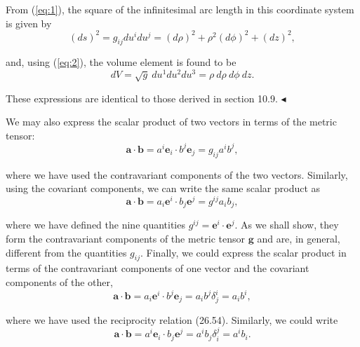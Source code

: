 \documentclass[9pt, twoside]{extbook}
\begin{document}
From (\ref{eq:1}), the square of the infinitesimal arc length in this coordinate system is given by
\begin{equation*}
	(ds)^{2} = g_{ij}du^{i}du^{j} = (d\rho)^{2} + \rho^{2}(d\phi)^{2} +(dz)^{2},
\end{equation*}

\noindent and, using (\ref{eq:2}), the volume element is found to be
\begin{equation*}
	dV = \sqrt{g} \ du^{1}du^{2}du^{3} = \rho \ d\rho \ d\phi \ dz.
\end{equation*}

\noindent These expressions are identical to those derived in section 10.9. $\blacktriangleleft$

\vspace{2mm}

\normalsize We may also express the scalar product of two vectors in terms of the metric tensor:
\begin{equation}
	\label{eq:4}
	\boldsymbol{a} \cdot \boldsymbol{b} = a^{i}\boldsymbol{e}_{i} \cdot b^{j}\boldsymbol{e}_{j} = g_{ij}a^{i}b^{j},
\end{equation}

\noindent where we have used the contravariant components of the two vectors. Similarly, using the covariant components, we can write the same scalar product as
\begin{equation}
	\boldsymbol{a} \cdot \boldsymbol{b} = a_{i}\boldsymbol{e}^{i} \cdot b_{j}\boldsymbol{e}^{j} = g^{ij}a_{i}b_{j},
\end{equation}

\noindent where we have defined the nine quantities $g^{ij} = \boldsymbol{e}^{i} \cdot \boldsymbol{e}^{j}$. As we shall show, they form the contravariant components of the metric tensor $\boldsymbol{g}$ and are, in general, different from the quantities $g_{ij}$. Finally, we could express the scalar product in terms of \linebreak the contravariant components of one vector and the covariant components of the other,
\begin{equation}
	\boldsymbol{a} \cdot \boldsymbol{b} = a_{i}\boldsymbol{e}^{i} \cdot b^{j}\boldsymbol{e}_{j} = a_{i}b^{j}\delta^{i}_{j} = a_{i}b^{i},
\end{equation}

\pagebreak

\noindent where we have used the reciprocity relation (26.54). Similarly, we could write
\begin{equation}
	\label{eq:5}
	\boldsymbol{a} \cdot \boldsymbol{b} = a^{i}\boldsymbol{e}_{i} \cdot b_{j}\boldsymbol{e}^{j} = a^{i}b_{j}\delta^{j}_{i} = a^{i}b_{i}.
\end{equation}
\end{document}

